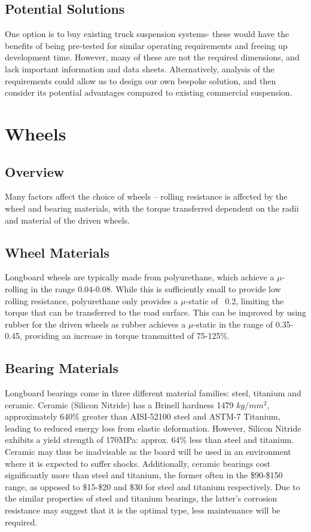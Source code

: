 \documentclass[journal,10pt]{IEEEtran}
\begin{document}
    \subsection{Potential Solutions}
        One option is to buy existing truck suspension systems- these would have the benefits of being pre-tested for similar operating requirements and freeing up development time. However, many of these are not the required dimensions, and lack important information and data sheets. Alternatively, analysis of the requirements could allow us to design our own bespoke solution, and then consider its potential advantages compared to existing commercial suspension. 
\section{Wheels}
    \subsection{Overview}
        Many factors affect the choice of wheels – rolling resistance is affected by the wheel and bearing materials, with the torque transferred dependent on the radii and material of the driven wheels.
    \subsection{Wheel Materials}
        Longboard wheels are typically made from polyurethane, which achieve a $\mu$-rolling in the range 0.04-0.08. While this is sufficiently small to provide low rolling resistance, polyurethane only provides a $\mu$-static of ~0.2, limiting the torque that can be transferred to the road surface. This can be improved by using rubber for the driven wheels as rubber achieves a $\mu$-static in the range of 0.35-0.45, providing an increase in torque transmitted of 75-125\%.
    \subsection{Bearing Materials}
        Longboard bearings come in three different material families: steel, titanium and ceramic. Ceramic (Silicon Nitride) has a Brinell hardness 1479 $kg/mm^{2}$, approximately 640\% greater than AISI-52100 steel and ASTM-7 Titanium, leading to reduced energy loss from elastic deformation. However, Silicon Nitride exhibits a yield strength of 170MPa: approx. 64\% less than steel and titanium. Ceramic may thus be inadvisable as the board will be used in an environment where it is expected to suffer shocks. Additionally, ceramic bearings cost significantly more than steel and titanium, the former often in the \$90-\$150 range, as opposed to \$15-\$20 and \$30 for steel and titanium respectively. Due to the similar properties of steel and titanium bearings, the latter’s corrosion resistance may suggest that it is the optimal type, less maintenance will be required. 
\end{document}
